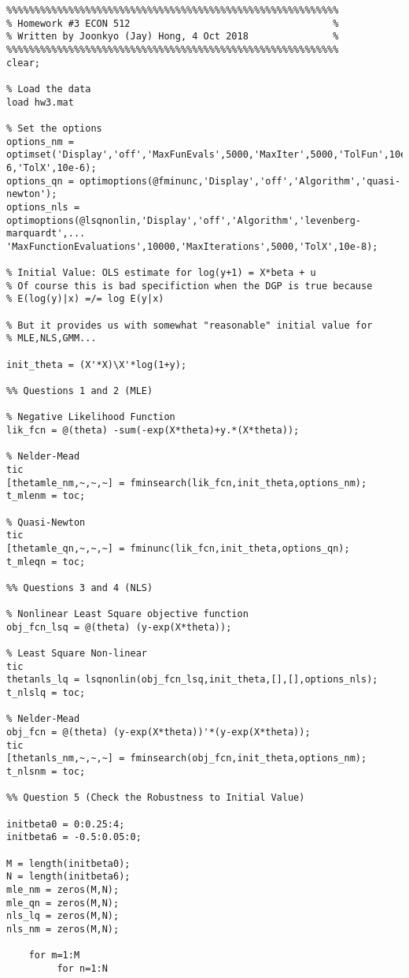 \documentclass[10pt, letterpaper]{article}
\begin{document}
\begin{verbatim}
%%%%%%%%%%%%%%%%%%%%%%%%%%%%%%%%%%%%%%%%%%%%%%%%%%%%%%%%%%%
% Homework #3 ECON 512                                    %
% Written by Joonkyo (Jay) Hong, 4 Oct 2018               %
%%%%%%%%%%%%%%%%%%%%%%%%%%%%%%%%%%%%%%%%%%%%%%%%%%%%%%%%%%%
clear;

% Load the data
load hw3.mat

% Set the options
options_nm = optimset('Display','off','MaxFunEvals',5000,'MaxIter',5000,'TolFun',10e-6,'TolX',10e-6);
options_qn = optimoptions(@fminunc,'Display','off','Algorithm','quasi-newton');
options_nls = optimoptions(@lsqnonlin,'Display','off','Algorithm','levenberg-marquardt',...
'MaxFunctionEvaluations',10000,'MaxIterations',5000,'TolX',10e-8);

% Initial Value: OLS estimate for log(y+1) = X*beta + u
% Of course this is bad specifiction when the DGP is true because
% E(log(y)|x) =/= log E(y|x)

% But it provides us with somewhat "reasonable" initial value for
% MLE,NLS,GMM...

init_theta = (X'*X)\X'*log(1+y);

%% Questions 1 and 2 (MLE)

% Negative Likelihood Function
lik_fcn = @(theta) -sum(-exp(X*theta)+y.*(X*theta));

% Nelder-Mead
tic
[thetamle_nm,~,~,~] = fminsearch(lik_fcn,init_theta,options_nm);
t_mlenm = toc;

% Quasi-Newton
tic
[thetamle_qn,~,~,~] = fminunc(lik_fcn,init_theta,options_qn);
t_mleqn = toc;

%% Questions 3 and 4 (NLS)

% Nonlinear Least Square objective function
obj_fcn_lsq = @(theta) (y-exp(X*theta));

% Least Square Non-linear 
tic
thetanls_lq = lsqnonlin(obj_fcn_lsq,init_theta,[],[],options_nls);
t_nlslq = toc;

% Nelder-Mead
obj_fcn = @(theta) (y-exp(X*theta))'*(y-exp(X*theta));
tic
[thetanls_nm,~,~,~] = fminsearch(obj_fcn,init_theta,options_nm);
t_nlsnm = toc;

%% Question 5 (Check the Robustness to Initial Value)

initbeta0 = 0:0.25:4;
initbeta6 = -0.5:0.05:0;

M = length(initbeta0);
N = length(initbeta6); 
mle_nm = zeros(M,N);
mle_qn = zeros(M,N);
nls_lq = zeros(M,N);
nls_nm = zeros(M,N);

    for m=1:M
         for n=1:N
         

\end{verbatim}
\end{document}
